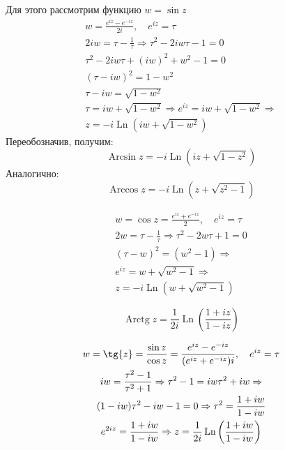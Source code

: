 \documentclass[a4paper, 12pt]{report}
\DeclareMathOperator\Arcsin{Arcsin}
\DeclareMathOperator\Arccos{Arccos}
\DeclareMathOperator\Arctg{Arctg}
\DeclareMathOperator\Ln{Ln}
\begin{document}
Для этого рассмотрим функцию $w=\sin z$
\begin{gather*}
    w=\frac{e^{iz}-e^{-iz}}{2i}, \quad e^{iz} = \tau \\
    2iw = \tau - \frac{1}{\tau} \Rightarrow \tau^2 - 2iw\tau - 1 = 0 \\
    \tau^2 - 2iw\tau + (iw)^2 + w^2 - 1 = 0 \\
    (\tau - iw)^2 = 1 - w^2 \\
    \tau - iw = \sqrt{1 - w^2} \\
    \tau = iw + \sqrt{1 - w^2} \Rightarrow e^{iz} = iw + \sqrt{1 - w^2} \Rightarrow \\
    z = -i\Ln \left(iw + \sqrt{1 - w^2} \right)
\end{gather*}
Переобозначив, получим:
\begin{equation*}
    \boxed{\Arcsin z = -i\Ln \left(iz + \sqrt{1 - z^2} \right)}
\end{equation*}
Аналогично: 
\begin{equation*}
    \boxed{\Arccos z = -i\Ln \left(z + \sqrt{z^2 - 1} \right)}
\end{equation*}

\begin{gather*}
    w=\cos{z}=\frac{e^{iz}+e^{-iz}}{2}, \quad e^{iz} = \tau \\
    2w = \tau - \frac{1}{\tau} \Rightarrow \tau^2 - 2w\tau + 1 = 0 \\
    (\tau - w)^2 = (w^2 - 1) \Rightarrow \\
    e^{iz} = w + \sqrt{w^2 - 1} \Rightarrow \\
    z = -i\Ln \left(w + \sqrt{w^2 - 1} \right)
\end{gather*}

\begin{equation*}
    \boxed{\Arctg z = \frac{1}{2i} \Ln \left( \frac{1 + iz}{1 - iz} \right)}
\end{equation*}

\begin{gather*}
    w=\tg{z}=\frac{\sin z}{\cos z} = \frac{e^{iz} - e^{-iz}}{(e^{iz} + e^{-iz})i}, \quad e^{iz} = \tau \\
    iw = \frac{\tau^2 - 1}{\tau^2 + 1} \Rightarrow \tau^2 - 1 = iw\tau^2 + iw \Rightarrow \\
    (1 - iw)\tau^2 - iw - 1 = 0 \Rightarrow \tau^2 = \frac{1 + iw}{1 - iw} \\
    e^{2iz} = \frac{1 + iw}{1 - iw} \Rightarrow z = \frac{1}{2i} \Ln \left( \frac{1 + iw}{1 - iw} \right)
\end{gather*}
\end{document}
